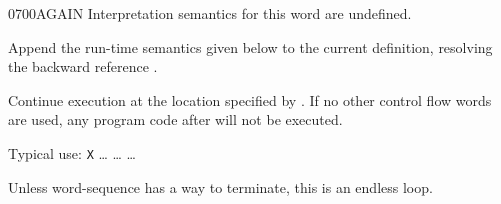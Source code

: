 \begin{worddef}{0700}{AGAIN}
\interpret
	Interpretation semantics for this word are undefined.

\compile

	Append the run-time semantics given below to the current
	definition, resolving the backward reference .

\runtime
	\stack{}{}

	Continue execution at the location specified by .
	If no other control flow words are used, any program code
	after  will not be executed.


	\begin{rationale} %
		Typical use:
			\word{:} \texttt{X}
				{\ldots}  {\ldots} 
			{\ldots} \word{;}

		Unless word-sequence has a way to terminate, this is an
		endless loop.
	\end{rationale}
\end{worddef}

